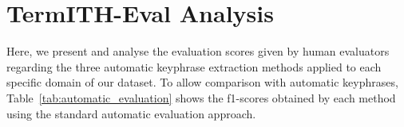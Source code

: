 \section{TermITH-Eval Analysis}
\label{sec:termith_eval_analysis}

        Here, we present and analyse the evaluation scores given by human evaluators regarding the three automatic keyphrase extraction methods applied to each specific domain of our dataset.
        To allow comparison with automatic keyphrases, Table~\ref{tab:automatic_evaluation} shows the f1-scores obtained by each method using the standard automatic evaluation approach.
        \begin{table}[h]
            \caption{
                Results of the automatic evaluation of TF-IDF, KEA and TopicRank in term of f1-score on each specific domain
                \label{tab:automatic_evaluation}
            }
        \end{table}
        
